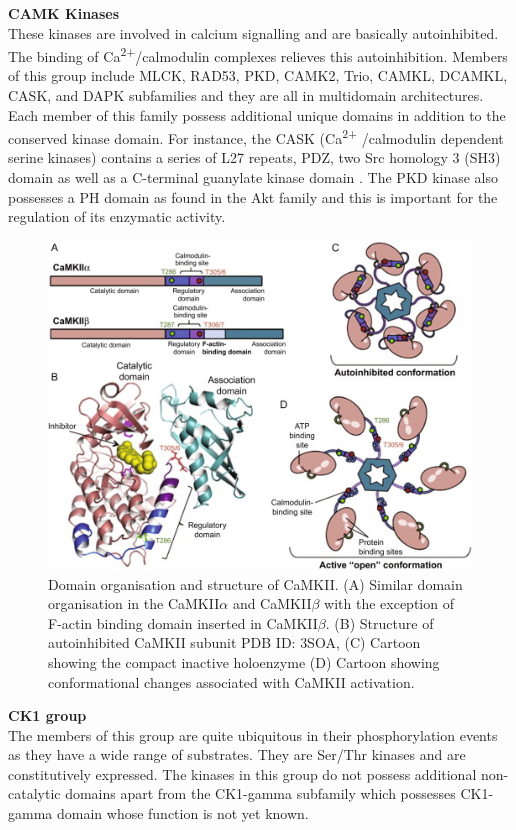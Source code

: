 \documentclass[a4paper, 11pt]{article}
\begin{document}
\textbf{CAMK Kinases}\\
These kinases are involved in calcium signalling and are basically autoinhibited. The binding of Ca\textsuperscript{2+}/calmodulin complexes relieves this autoinhibition. Members of this group include MLCK, RAD53, PKD, CAMK2, Trio, CAMKL, DCAMKL, CASK, and DAPK subfamilies and they are all in multidomain architectures. Each member of this family possess additional unique domains in addition to the conserved kinase domain. For instance, the CASK (Ca\textsuperscript{2+} /calmodulin dependent serine kinases) contains a series of L27 repeats, PDZ, two Src homology 3 (SH3) domain as well as a C-terminal guanylate kinase domain \cite{rakshambikai2015typical}. The PKD kinase also possesses a PH domain as found in the Akt family and this is important for the regulation of its enzymatic activity.\\
\begin{figure}[H]
	\includegraphics[width=.8\linewidth]{figures/camk_kinase.jpg}
	\centering
	\caption{Domain organisation and structure of CaMKII. (A) Similar domain organisation in the CaMKII$\alpha$ and CaMKII$\beta$ with the exception of F-actin binding domain inserted in CaMKII$\beta$. (B) Structure of autoinhibited CaMKII subunit PDB ID: 3SOA, (C) Cartoon showing the compact inactive holoenzyme (D) Cartoon showing conformational changes associated with CaMKII activation.}
	\label{camk_kinase}
\end{figure}
\textbf{CK1 group}\\
The members of this group are quite ubiquitous in their phosphorylation events as they have a wide range of substrates. They are Ser/Thr kinases and are constitutively expressed. The kinases in this group do not possess additional non-catalytic domains apart from the CK1-gamma subfamily which possesses CK1-gamma domain whose function is not yet known.\\
\end{document}
